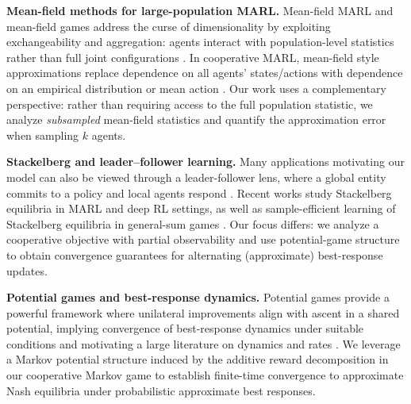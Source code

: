 \textbf{Mean-field methods for large-population MARL.} 
Mean-field MARL and mean-field games address the curse of dimensionality by exploiting exchangeability and aggregation:
agents interact with population-level statistics rather than full joint configurations \citep{lasry2018mean, yang2019sample, gu2022meanfieldmultiagentreinforcementlearning, gu2021meanfieldcontrolsqlearningcooperative, anand2025meanfield}. In cooperative MARL, mean-field style
approximations replace dependence on all agents' states/actions with dependence on an empirical distribution or mean action \cite{10.1145/3308558.3313433,cui2022learning,carmona2013probabilistic,subramanian2022decentralized}.
Our work uses a complementary perspective: rather than requiring access to the full population statistic, we analyze
\emph{subsampled} mean-field statistics and quantify the approximation error when sampling $k$ agents.

\textbf{Stackelberg and leader--follower learning.}
Many applications motivating our model can also be viewed through a leader-follower lens, where a global entity commits to a
policy and local agents respond \cite{bacchiocchi2024samplecomplexitystackelberggames, 10310098, 4597505, bruckner2011stackelberg, yu2022learningcorrelatedstackelbergequilibrium}. Recent works study Stackelberg equilibria in MARL and deep RL settings, as well as
sample-efficient learning of Stackelberg equilibria in general-sum games \citep{10.5555/3540261.3542236, 10.5555/3618408.3618858, balcan2025learningstructuredstackelberggames, gan2025robust}.
Our focus differs: we analyze a cooperative objective with  partial observability and use potential-game structure
to obtain convergence guarantees for alternating (approximate) best-response updates. 

\textbf{Potential games and best-response dynamics.}
Potential games \citep{Monderer1996, guo2025markovalphapotentialgames, arefizadeh2024characterizationspotentialordinalpotential} provide a powerful framework where unilateral improvements align with ascent in a
shared potential, implying convergence of best-response dynamics under suitable conditions and motivating a large literature on dynamics and rates  \citep{doi:10.1137/17M1139461,chen2022convergencepriceanarchyguarantees,leonardos2025globalconvergencemultiagentpolicy,doi:10.1137/1.9781611976465.84,overman2025oversightgamelearningcooperatively,chen2022almost,yang2019sample,du2021bilinear, giannou2021rate, 10.1007/s00182-023-00837-4}. We leverage a Markov potential structure induced by
the additive reward decomposition in our cooperative Markov game to establish finite-time convergence to approximate Nash
equilibria under probabilistic approximate best responses. 
  


